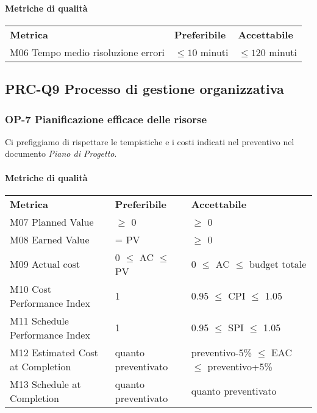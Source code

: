 			\paragraph{Metriche di qualità} \mbox{}			
			\begin{longtable} {
					>{}p{80mm} 
					>{}p{25mm}
					>{}p{25mm}
				}
				\rowcolor{gray!50}
				\textbf{Metrica} & \textbf{Preferibile} & \textbf{Accettabile} \TBstrut \TBstrut \\
				M06 Tempo medio risoluzione errori & $\le 10$ minuti & $\le 120$ minuti \TBstrut \\ [2mm]
			\end{longtable}					

	\subsection{PRC-Q9 Processo di gestione organizzativa}
		\subsubsection{OP-7 Pianificazione efficace delle risorse}
			Ci prefiggiamo di rispettare le tempistiche e i costi indicati nel preventivo nel documento \textit{Piano di Progetto}.
			\paragraph{Metriche di qualità} \mbox{} 
			\begin{longtable} {
					>{}p{60mm} 
					>{}p{35mm}
					>{}p{50mm}
				}
				\rowcolor{gray!50}
				\textbf{Metrica} & \textbf{Preferibile} & \textbf{Accettabile} \TBstrut \TBstrut \\
				M07 Planned Value & $\ge$ 0 & $\ge$ 0 \TBstrut \\ [2mm]
				M08 Earned Value & = PV & $\ge$ 0 \TBstrut \\ [2mm]
				M09 Actual cost & 0 $\le$ AC $\le$ PV &0 $\le$ AC $\le$ budget totale \TBstrut \\ [2mm]				
				M10 Cost Performance Index & 1 & 0.95 $\le$ CPI $\le$ 1.05 \TBstrut \\ [2mm]				
				M11 Schedule Performance Index & 1 & 0.95 $\le$ SPI $\le$ 1.05 \TBstrut \\ [2mm]				
				M12 Estimated Cost at Completion & quanto preventivato & preventivo-5\% $\le$ EAC $\le$ preventivo+5\% \TBstrut \\ [2mm]
				M13 Schedule at Completion & quanto preventivato & quanto preventivato \TBstrut \\ [2mm]				
			\end{longtable}

